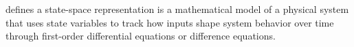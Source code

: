 \documentclass[a4paper]{article}
\title{}
\date{}
\begin{document}
\maketitle

     defines a state-space representation is a mathematical model of a physical system that uses state variables to track how inputs shape system behavior over time through first-order differential equations or difference equations. 
\end{document}
